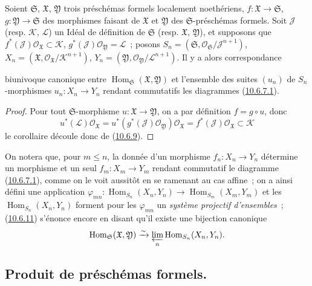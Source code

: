 \begin{corollary}[10.6.11]
\label{I.10.6.11-fr}
Soient $\mathfrak{S}$, $\mathfrak{X}$, $\mathfrak{Y}$ trois
préschémas formels localement noethériens,
$f:\mathfrak{X}\to\mathfrak{S}$,
$g:\mathfrak{Y}\to\mathfrak{S}$ des morphismes faisant de
$\mathfrak{X}$ et $\mathfrak{Y}$ des $\mathfrak{S}$-préschémas
formels. Soit $\mathscr{J}$ (resp. $\mathscr{K}$, $\mathscr{L}$) un
Idéal de définition de $\mathfrak{S}$ (resp. $\mathfrak{X}$,
$\mathfrak{Y}$), et supposons que
$f^*(\mathscr{J})\mathscr{O}_{\mathfrak{X}}\subset\mathscr{K}$,
$g^*(\mathscr{J})\mathscr{O}_{\mathfrak{Y}}=\mathscr{L}$~; posons
$S_n=(\mathfrak{S},
\mathscr{O}_{\mathfrak{S}}/\mathscr{J}^{n+1})$,
$X_n=(\mathfrak{X},
\mathscr{O}_{\mathfrak{X}}/\mathscr{K}^{n+1})$,
$Y_n=(\mathfrak{Y},
\mathscr{O}_{\mathfrak{Y}}/\mathscr{L}^{n+1})$. Il y a alors
correspondance


biunivoque canonique entre
$\operatorname{Hom}_{\mathfrak{S}}(\mathfrak{X},\mathfrak{Y})$ et
l'ensemble des suites $(u_n)$ de $S_n$-morphismes
$u_n:X_n\to Y_n$ rendant commutatifs les diagrammes
(\hyperref[I.10.6.7.1-fr]{10.6.7.1}).
\end{corollary}

\begin{proof}
Pour tout $\mathfrak{S}$-morphisme
$u:\mathfrak{X}\to\mathfrak{Y}$, on a par définition $f=g\circ u$, donc
\[
  u^*(\mathscr{L})\mathscr{O}_{\mathfrak{X}}
  =u^*(g^*(\mathscr{J})\mathscr{O}_{\mathfrak{Y}})
    \mathscr{O}_{\mathfrak{X}}
  =f^*(\mathscr{J})\mathscr{O}_{\mathfrak{X}}
  \subset\mathscr{K}
\]
le corollaire découle donc de
(\hyperref[I.10.6.9-fr]{10.6.9}).
\end{proof}

On notera que, pour $m\leq n$, la donnée d'un morphisme
$f_n:X_n\to Y_n$ détermine un morphisme et un seul
$f_m:X_m\to Y_m$ rendant commutatif le diagramme
(\hyperref[I.10.6.7.1-fr]{10.6.7.1}), comme on le voit aussitôt en se
ramenant au cas affine~; on a ainsi défini une application
$\varphi_{mn}:\operatorname{Hom}_{S_n}(X_n,Y_n)
\to\operatorname{Hom}_{S_m}(X_m,Y_m)$ et les
$\operatorname{Hom}_{S_n}(X_n,Y_n)$ forment pour les $\varphi_{mn}$ un
\emph{système projectif d'ensembles}~;
(\hyperref[I.10.6.11-fr]{10.6.11}) s'énonce encore en disant qu'il existe
une bijection canonique
\[
  \operatorname{Hom}_{\mathfrak{S}}(\mathfrak{X},\mathfrak{Y})
  \xrightarrow{\sim}
  \varprojlim_n\operatorname{Hom}_{S_n}(X_n,Y_n).
\]

\subsection{Produit de préschémas formels.}
\label{subsection:I.10.7-fr}

